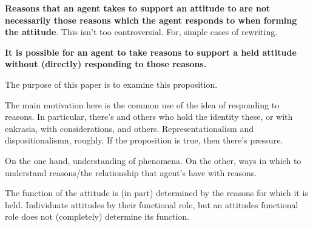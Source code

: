 \documentclass[10pt]{article}
\begin{document}
\textbf{Reasons that an agent takes to support an attitude to are not necessarily those reasons which the agent responds to when forming the attitude}.
This isn't too controversial.
For, simple cases of rewriting.


\textbf{It is possible for an agent to take reasons to support a held attitude without (directly) responding to those reasons.}

The purpose of this paper is to examine this proposition.

The main motivation here is the common use of the idea of responding to reasons.
In particular, there's \citeauthor{Lord:2018aa} and others who hold the identity these, or \citeauthor{Broome:2013aa} with enkrasia, \citeauthor{Hieronymi:2018aa} with considerations, and others.
Representationalism and dispositionalismn, roughly.
If the proposition is true, then there's pressure.

On the one hand, understanding of phenomena.
On the other, ways in which to understand reasons/the relationship that agent's have with reasons.


\begin{note}
  The function of the attitude is (in part) determined by the reasons for which it is held.
  Individuate attitudes by their functional role, but an attitudes functional role does not (completely) determine its function.
\end{note}
\end{document}

